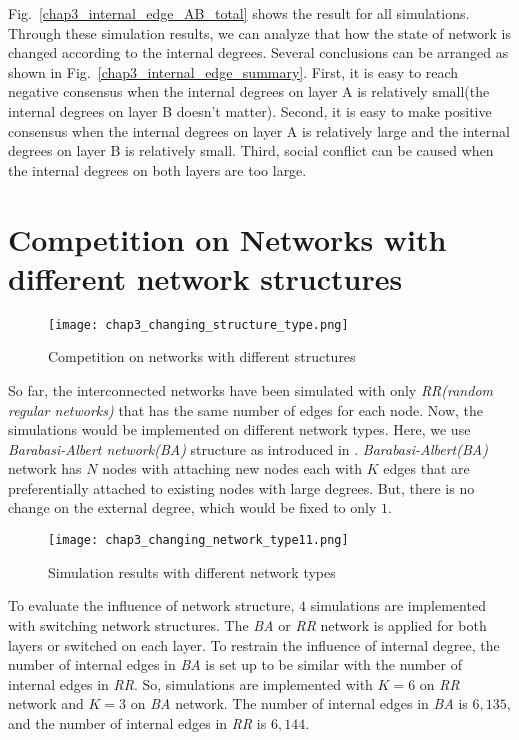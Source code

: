 Fig.~\ref{chap3_internal_edge_AB_total} shows the result for all simulations. Through these simulation results, we can analyze that how the state of network is changed according to the internal degrees. Several conclusions can be arranged as shown in Fig.~\ref{chap3_internal_edge_summary}.  First, it is easy to reach negative consensus when the internal degrees on layer A is relatively small(the internal degrees on layer B doesn't matter). Second, it is easy to make positive consensus when the internal degrees on layer A is relatively large and the internal degrees on layer B is relatively small. Third, social conflict can be caused when the internal degrees on both layers are too large. \\ 

\section{Competition on Networks with different network structures}
\begin{figure}[!htb]
	\centering
	\texttt{[image: chap3\_changing\_structure\_type.png]}
	\caption{Competition on networks with different structures}
	\label{chap3_changing_structure_type}
\end{figure}
So far, the interconnected networks have been simulated with only \textit{RR(random regular networks)} that has the same number of edges for each node. Now, the simulations would be implemented on different network types. Here, we use \textit{Barabasi-Albert network(BA)} structure as introduced in \parencite{barabasi1999}. \textit{Barabasi-Albert(BA)} network has $N$ nodes with attaching new nodes each with $K$ edges that are preferentially attached to existing nodes with large degrees. But, there is no change on the external degree, which would be fixed to only $1$.

\begin{figure}[!htb]
	\centering
	\texttt{[image: chap3\_changing\_network\_type11.png]}
	\caption{Simulation results with different network types}
	\label{chap3_changing_network_type1}
\end{figure}

To evaluate the influence of network structure, $4$ simulations are implemented with switching network structures. The \textit{BA} or \textit{RR} network is applied for both layers or switched on each layer. To restrain the influence of internal degree, the number of internal edges in \textit{BA} is set up to be similar with the number of internal edges in \textit{RR}. So, simulations are implemented with $K=6$ on \textit{RR} network and $K=3$ on \textit{BA} network. The number of internal edges in \textit{BA} is $6,135$, and the number of internal edges in \textit{RR} is $6,144$.

